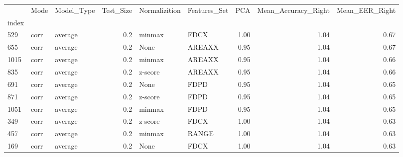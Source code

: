 \begin{tabular}{lllrllrrr}
\toprule
{} &  Mode & Model\_Type &  Test\_Size & Normalizition & Features\_Set &   PCA &  Mean\_Accuracy\_Right &  Mean\_EER\_Right \\
index &       &            &            &               &              &       &                      &                 \\
\midrule
529   &  corr &    average &        0.2 &        minmax &         FDCX &  1.00 &                 1.04 &            0.67 \\
655   &  corr &    average &        0.2 &          None &       AREAXX &  0.95 &                 1.04 &            0.67 \\
1015  &  corr &    average &        0.2 &        minmax &       AREAXX &  0.95 &                 1.04 &            0.66 \\
835   &  corr &    average &        0.2 &       z-score &       AREAXX &  0.95 &                 1.04 &            0.66 \\
691   &  corr &    average &        0.2 &          None &         FDPD &  0.95 &                 1.04 &            0.65 \\
871   &  corr &    average &        0.2 &       z-score &         FDPD &  0.95 &                 1.04 &            0.65 \\
1051  &  corr &    average &        0.2 &        minmax &         FDPD &  0.95 &                 1.04 &            0.65 \\
349   &  corr &    average &        0.2 &       z-score &         FDCX &  1.00 &                 1.04 &            0.63 \\
457   &  corr &    average &        0.2 &        minmax &        RANGE &  1.00 &                 1.04 &            0.63 \\
169   &  corr &    average &        0.2 &          None &         FDCX &  1.00 &                 1.04 &            0.63 \\
\bottomrule
\end{tabular}
